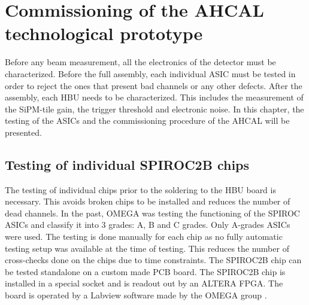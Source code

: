 \chapter{Commissioning of the AHCAL technological prototype}

Before any beam measurement, all the electronics of the detector must be characterized. Before the full assembly, each individual ASIC must be tested in order to reject the ones that present bad channels or any other defects. After the assembly, each HBU needs to be characterized. This includes the measurement of the SiPM-tile gain, the trigger threshold and electronic noise. In this chapter, the testing of the ASICs and the commissioning procedure of the AHCAL will be presented.

\section{Testing of individual SPIROC2B chips}

The testing of individual chips prior to the soldering to the HBU board is necessary. This avoids broken chips to be installed and reduces the number of dead channels. In the past, OMEGA was testing the functioning of the SPIROC ASICs and classify it into 3 grades: A, B and C grades. Only A-grades ASICs were used. The testing is done manually for each chip as no fully automatic testing setup was available at the time of testing. This reduces the number of cross-checks done on the chips due to time constraints. The SPIROC2B chip can be tested standalone on a custom made PCB board. The SPIROC2B chip is installed in a special socket and is readout out by an ALTERA FPGA. The board is operated by a Labview software made by the OMEGA group \cite{OmegaWeb}.

